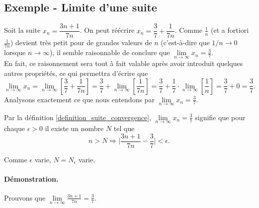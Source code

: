 \documentclass[oneside,11pt,french,table]{book}
\theoremstyle{definition}
\theoremstyle{plain}
\theoremstyle{remark}
\begin{document}
\subsection{Exemple - Limite d'une suite }
Soit la suite $x_n=\dfrac{3n+1}{7n}$. On peut réécrire $x_n = \dfrac{3}{7} + \dfrac{1}{7n}$. Comme $\frac{1}{n}$ (et a fortiori $\frac{1}{7n}$) devient très petit pour de grandes valeurs de $n$ (c'est-à-dire que $1/n \to 0$ lorsque $n\to \infty$), il semble raisonnable de conclure que $\lim\limits_{n\to \infty}{x_n}=\frac{3}{7}$. \\
En fait, ce raisonnement sera tout à fait valable après avoir introduit quelques autres propriétés, ce qui permettra d'écrire que 
\begin{equation*}
    \lim\limits_{n\to \infty}{x_n}=\lim\limits_{n\to \infty}{ \left[ \dfrac{3}{7} + \dfrac{1}{7n} \right] }= \dfrac{3}{7} + \lim\limits_{n \to \infty}{\left[ \dfrac{1}{7n} \right]} = \dfrac{3}{7} + \dfrac{1}{7} \cdot \lim\limits_{n \to \infty}{\left[ \dfrac{1}{n} \right] } = \dfrac{3}{7} + 0 = \dfrac{3}{7}. 
\end{equation*}
Analysons exactement ce que nous entendons par $\lim\limits_{n\to \infty}{x_n}=\frac{3}{7}$. 
\begin{center}

\begin{minipage}{0.75\textwidth}
  Par la définition \textcolor{blue}{\ref{definition_suite_convergence}}, $\lim\limits_{n\to \infty}{x_n}=\frac{3}{7}$ signifie que pour chaque $\epsilon>0$ il existe un nombre $N$ tel que
  \begin{equation}
      n>N \Longrightarrow \bigg|\displaystyle\frac{3n+1}{7n}-\frac{3}{7}\bigg|<\epsilon.
  \end{equation}
\end{minipage}
\end{center}
  Comme $\epsilon$ varie, $N=N_\epsilon$ varie. 
  \paragraph{Démonstration.}
Prouvons que $\lim\limits_{n \to \infty}{\displaystyle\frac{3n+1}{7n}}=\frac{3}{7}$. 
\end{document}
